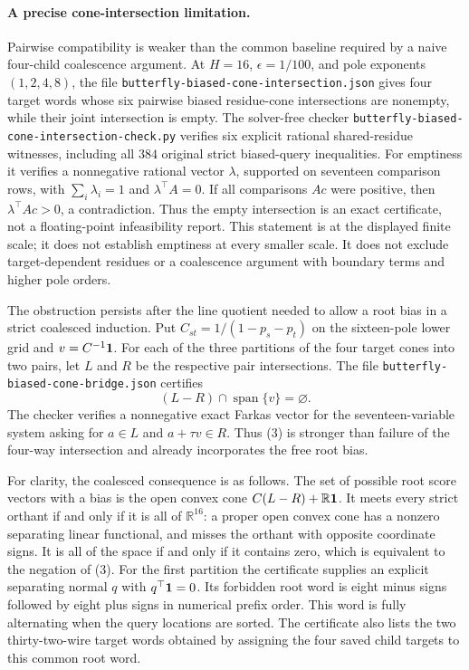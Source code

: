 \documentclass[11pt]{article}
\begin{document}
\paragraph{A precise cone-intersection limitation.}
Pairwise compatibility is weaker than the common baseline required by a
naive four-child coalescence argument. At $H=16$, $\epsilon=1/100$, and
pole exponents $(1,2,4,8)$, the file
\texttt{butterfly-biased-cone-intersection.json} gives four target words
whose six pairwise biased residue-cone intersections are nonempty,
while their joint intersection is empty. The solver-free checker
\texttt{butterfly-biased-cone-intersection-check.py} verifies six explicit
rational shared-residue witnesses, including all $384$ original strict
biased-query inequalities. For emptiness it verifies a nonnegative
rational vector $\lambda$, supported on seventeen comparison rows,
with $\sum_i\lambda_i=1$ and $\lambda^\top A=0$. If all comparisons
$Ac$ were positive, then $\lambda^\top Ac>0$, a contradiction.
Thus the empty intersection is an exact certificate, not a floating-point
infeasibility report. This statement is at the displayed finite scale;
it does not establish emptiness at every smaller scale. It does not
exclude target-dependent residues or a coalescence argument with boundary
terms and higher pole orders.


The obstruction persists after the line quotient needed to allow a
root bias in a strict coalesced induction. Put
$C_{st}=1/(1-p_s-p_t)$ on the sixteen-pole lower grid and
$v=C^{-1}{\bf1}$. For each of the three partitions of the four target
cones into two pairs, let $L$ and $R$ be the respective pair
intersections. The file \texttt{butterfly-biased-cone-bridge.json}
certifies
\[
 (L-R)\cap\operatorname{span}\{v\}=\varnothing.       \tag{3}
\]
The checker verifies a nonnegative exact Farkas vector for the
seventeen-variable system asking for $a\in L$ and
$a+\tau v\in R$. Thus (3) is stronger than failure of the four-way
intersection and already incorporates the free root bias.

For clarity, the coalesced consequence is as follows. The set of
possible root score vectors with a bias is the open convex cone
$C(L-R)+\mathbb R{\bf1}$. It meets every strict orthant if and only if
it is all of $\mathbb R^{16}$: a proper open convex cone has a nonzero
separating linear functional, and misses the orthant with opposite
coordinate signs. It is all of the space if and only if it contains
zero, which is equivalent to the negation of (3). For the first
partition the certificate supplies an explicit separating normal $q$
with $q^\top{\bf1}=0$. Its forbidden root word is eight minus signs
followed by eight plus signs in numerical prefix order. This word is
fully alternating when the query locations are sorted. The certificate
also lists the two thirty-two-wire target words obtained by assigning
the four saved child targets to this common root word.
\end{document}
